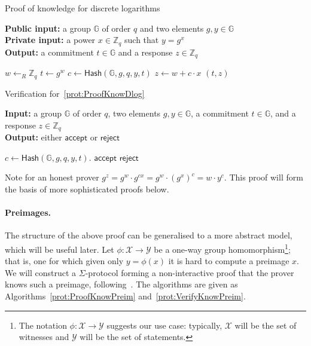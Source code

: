 \documentclass[12pt,a4paper]{article}
\theoremstyle{definition}
\begin{document}
\begin{algorithm}\caption{Proof of knowledge for discrete logarithms}\label{prot:ProofKnowDlog}
    \textbf{Public input:} a group $\mathbb{G}$ of order $q$ and two elements $g, y\in\mathbb{G}$\\
    \textbf{Private input:} a power $x\in\mathbb{Z}_q$ such that $y = g^x$\\
    \textbf{Output:} a commitment $t\in\mathbb{G}$ and a response $z\in\mathbb{Z}_q$
    \begin{algorithmic}[1]
        \State $w\gets_R\mathbb{Z}_q$
        \State $t \gets g^w$
        \State $c\gets\mathsf{Hash}(\mathbb{G}, g, q, y, t)$
        \State $z\gets w+c\cdot x$
        \State \Return $(t, z)$
    \end{algorithmic}
\end{algorithm}
\begin{algorithm}\caption{Verification for~\ref{prot:ProofKnowDlog}}\label{prot:VerifyKnowDlog}
    \textbf{Input:} a group $\mathbb{G}$ of order $q$, two elements $g, y\in\mathbb{G}$, a commitment $t\in\mathbb{G}$, and a response $z\in\mathbb{Z}_q$\\
    \textbf{Output:} either $\mathsf{accept}$ or $\mathsf{reject}$
    \begin{algorithmic}[1]
        \State $c\gets\mathsf{Hash}(\mathbb{G}, g, q, y, t)$.
            \State \Return $\mathsf{accept}$
        \Else
            \State \Return $\mathsf{reject}$
        \EndIf
    \end{algorithmic}
\end{algorithm}
Note for an honest prover $g^z=g^w\cdot g^{cx}=g^w\cdot (g^x)^c=w\cdot y^c$. This proof will form the basis of more sophisticated proofs below.

\paragraph{Preimages.}\label{sec-preimage}
The structure of the above proof can be generalised to a more abstract model, which will be useful later. Let $\phi:\mathcal{X}\rightarrow \mathcal{Y}$ be a one-way group homomorphism\footnote{The notation $\phi:\mathcal{X}\to\mathcal{Y}$ suggests our use case: typically, $\mathcal{X}$ will be the set of witnesses and $\mathcal{Y}$ will be the set of statements.}; that is, one for which given only $y = \phi(x)$ it is hard to compute a preimage $x$. We will construct a $\Sigma$-protocol forming a non-interactive proof that the prover knows such a preimage, following~\cite{haenni2017pseudo}. The algorithms are given as Algorithms~\ref{prot:ProofKnowPreim} and~\ref{prot:VerifyKnowPreim}.
\end{document}
